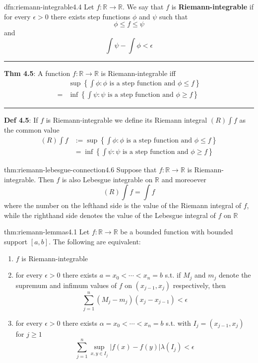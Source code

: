 \documentclass[landscape, 8pt]{extarticle}
\begin{document}
\begin{multicols}{3}
\begin{dfn}{dfn:riemann-integrable}{4.4}
	Let $f : \mathbb{R} \to \mathbb{R}$. We say that $f$ is \textbf{Riemann-integrable} if for every $\epsilon > 0$ there exists step functions $\phi$ and $\psi$ such that
	\[\phi \le f \le \psi\]
	and
	\[\int \psi - \int \phi < \epsilon\]

	\noindent\rule{\textwidth}{0.2pt}
	\textbf{Thm 4.5}: A function $f : \mathbb{R}\to \mathbb{R}$ is Riemann-integrable iff
	\begin{align*}
		& \sup \left\{\int \phi : \text{$\phi$ is a step function and $\phi \le f$}\right\} \\
		= & \inf \left\{\int \psi : \text{$\psi$ is a step function and $\phi \ge f$}\right\}
	\end{align*}

	\noindent\rule{\textwidth}{0.2pt}
	\textbf{Def 4.5}: If $f$ is Riemann-integrable we define its Riemann integral $(R) \int f$ as the common value
	\begin{align*}
		(R) \int f&:= \sup \left\{\int \phi : \text{$\phi$ is a step function and $\phi \le f$}\right\} \\
		&= \inf \left\{\int \psi : \text{$\psi$ is a step function and $\phi \ge f$}\right\}
	\end{align*}
\end{dfn}

\begin{thm}{thm:riemann-lebesgue-connection}{4.6}
	Suppose that $f : \mathbb{R} \to \mathbb{R}$ is Riemann-integrable. Then $f$ is also Lebesgue integrable on $\mathbb{R}$ and moreoever
	\[(R) \int f = \int f\]
	where the number on the lefthand side is the value of the Riemann integral of $f$, while the righthand side denotes the value of the Lebesgue integral of $f$ on $\mathbb{R}$
\end{thm}

\begin{thm}{thm:riemann-lemmas}{4.1}
	Let $f : \mathbb{R} \to \mathbb{R}$ be a bounded function with bounded support $[a, b]$. The following are equivalent:
	\begin{enumerate}
	    \item $f$ is Riemann-integrable
	    \item for every $\epsilon > 0$ there exists $a = x_{0} < \cdots < x_{n} = b$ s.t. if $M_{j}$ and $m_{j}$ denote the supremum and infimum values of $f$ on $(x_{j-1}, x_{j})$ respectively, then
			\[\sum_{j = 1}^{n}(M_{j} - m_{j})(x_{j} - x_{j - 1}) < \epsilon\]
		\item for every $\epsilon > 0$ there exists $\alpha = x_{0} < \cdots < x_{n} = b$ s.t. with $I_{j} = (x_{j-1}, x_{j})$ for $j \ge 1$
			\[\sum_{j = 1}^{n} \sup_{x,y\in I_{j}} \lvert f(x) - f(y) \rvert \lambda(I_{j}) < \epsilon\]
	\end{enumerate}


\end{thm}
\end{multicols}
\end{document}
